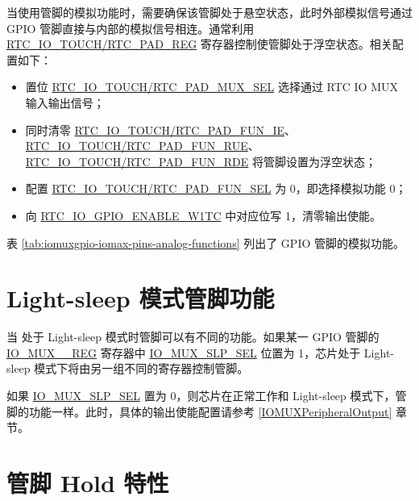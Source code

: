 \documentclass[main\_\_CN.tex]{subfiles}
\begin{document}
当使用管脚的模拟功能时，需要确保该管脚处于悬空状态，此时外部模拟信号通过 GPIO 管脚直接与内部的模拟信号相连。通常利用 \hyperref[regdesc:RTCIOTOUCHPADNREG]{RTC\_IO\_TOUCH/RTC\_PAD\_REG} 寄存器控制使管脚处于浮空状态。相关配置如下：

\begin{itemize}
    \item 置位 \hyperref[fielddesc:RTCIOTOUCHPADNMUXSEL]{RTC\_IO\_TOUCH/RTC\_PAD\_MUX\_SEL} 选择通过 RTC IO MUX 输入输出信号；
    \item 同时清零 \hyperref[regdesc:RTCIOTOUCHPADNREG]{RTC\_IO\_TOUCH/RTC\_PAD\_FUN\_IE}、\hyperref[regdesc:RTCIOTOUCHPADNREG]{RTC\_IO\_TOUCH/RTC\_PAD\_FUN\_RUE}、\hyperref[regdesc:RTCIOTOUCHPADNREG]{RTC\_IO\_TOUCH/RTC\_PAD\_FUN\_RDE} 将管脚设置为浮空状态；
    \item 配置 \hyperref[regdesc:RTCIOTOUCHPADNREG]{RTC\_IO\_TOUCH/RTC\_PAD\_FUN\_SEL} 为 0，即选择模拟功能 0；

    \item 向 \hyperref[regdesc:RTCIOTOUCHPADNREG]{RTC\_IO\_GPIO\_ENABLE\_W1TC} 中对应位写 1，清零输出使能。
\end{itemize}
表 \ref{tab:iomuxgpio-iomax-pins-analog-functions} 列出了 GPIO 管脚的模拟功能。


\section{Light-sleep 模式管脚功能}

当 \chipname{} 处于 Light-sleep 模式时管脚可以有不同的功能。如果某一 GPIO 管脚的 \hyperref[regdesc:IOMUXnREG]{IO\_MUX\_\_REG} 寄存器中 \hyperref[fielddesc:IOMUXSLPSEL]{IO\_MUX\_SLP\_SEL} 位置为 1，芯片处于 Light-sleep 模式下将由另一组不同的寄存器控制管脚。



\begin{tiplisting}
如果 \hyperref[fielddesc:IOMUXSLPSEL]{IO\_MUX\_SLP\_SEL} 置为 0，则芯片在正常工作和 Light-sleep 模式下，管脚的功能一样。此时，具体的输出使能配置请参考 \ref{IOMUXPeripheralOutput} 章节。

\end{tiplisting}

\section{管脚 Hold 特性}\label{PadHold}
\end{document}
